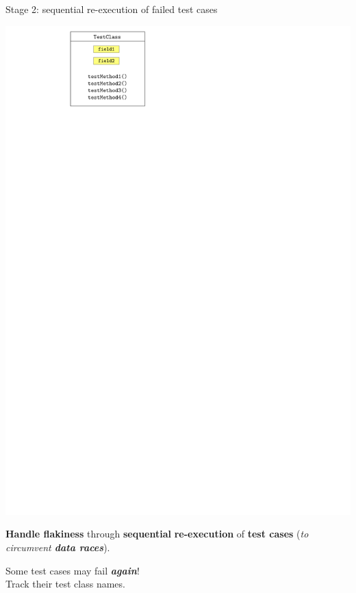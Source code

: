 \documentclass{beamer}
\begin{document}
\begin{frame}{Stage 2: sequential re-execution of failed test cases}
\begin{center}
\begin{minipage}{0.48\linewidth}
			\includegraphics[width=0.85\linewidth,page=3]{images/flakes.pdf}
		\end{minipage}	
	\end{center}
	\textbf{Handle flakiness} through \textbf{sequential} {\color{blue}\textbf{re-execution}} of \textbf{\color{indiagreen}test cases} ({\textit{to circumvent {\color{red}\textbf{data races}}}}).\pause
	\vfill
	\begin{center}
	Some test cases may fail \textit{\textbf{again}}! \\
	Track their test class names.
	\end{center}
\end{frame}
\end{document}
